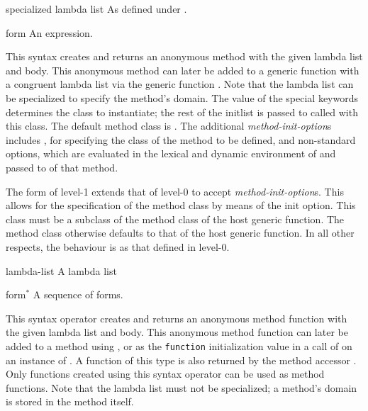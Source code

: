 \begin{optDefinition}
\begin{arguments}
    \item[specialized lambda list] As defined under .

    \item[form] An expression.
\end{arguments}
%
\result%
This syntax creates and returns an anonymous method with the given
lambda list and body.  This anonymous method can later be added to a generic
function with a congruent lambda list via the generic function
.  Note that the lambda list can be specialized to
specify the method's domain.  The value of the special keywords 
determines the class to instantiate; the rest of the initlist is passed to
 called with this class.  The default method class is
.
%
\remarks%
The additional {\em method-init-option\/}s includes , for
specifying the class of the method to be defined, and non-standard
options, which are evaluated in the lexical and dynamic environment of
 and passed to  of that method.

\Syntax
{}%
%
%
\remarks%
The  form of level-1 extends that of level-0 to accept
{\em method-init-option\/}s.  This allows for the specification of the
method class by means of the  init option.  This class must
be a subclass of the method class of the host generic function. The
method class otherwise defaults to that of the host generic function.
In all other respects, the behaviour is as that defined in level-0.

%
\begin{arguments}
    \item[lambda-list] A lambda list
    \item[form$^*$] A sequence of forms.
\end{arguments}
%
This syntax operator creates and returns an anonymous method function with the
given lambda list and body. This anonymous method function can later be added to
a method using , or as the {\tt function}
initialization value in a call of  on an instance of
.  A function of this type is also returned by the method
accessor .  Only functions created using this
syntax operator can be used as method functions.  Note that the lambda list must
not be specialized; a method's domain is stored in the method itself.


\end{optDefinition}
